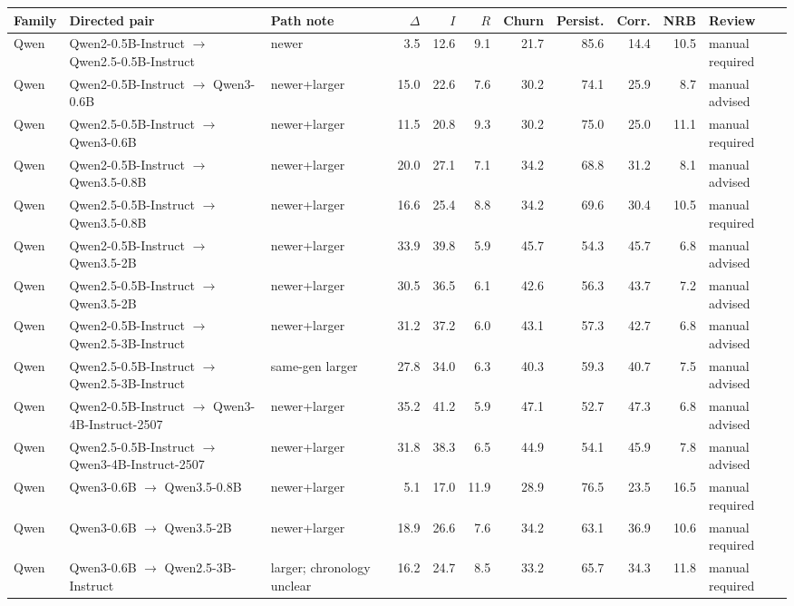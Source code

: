 \begin{tabular}{lllrrrrrrrl}
\toprule
Family & Directed pair & Path note & $\Delta$ & $I$ & $R$ & Churn & Persist. & Corr. & NRB & Review \\
\midrule
Qwen & Qwen2-0.5B-Instruct $\rightarrow$ Qwen2.5-0.5B-Instruct & newer & 3.5 & 12.6 & 9.1 & 21.7 & 85.6 & 14.4 & 10.5 & manual required \\
Qwen & Qwen2-0.5B-Instruct $\rightarrow$ Qwen3-0.6B & newer+larger & 15.0 & 22.6 & 7.6 & 30.2 & 74.1 & 25.9 & 8.7 & manual advised \\
Qwen & Qwen2.5-0.5B-Instruct $\rightarrow$ Qwen3-0.6B & newer+larger & 11.5 & 20.8 & 9.3 & 30.2 & 75.0 & 25.0 & 11.1 & manual required \\
Qwen & Qwen2-0.5B-Instruct $\rightarrow$ Qwen3.5-0.8B & newer+larger & 20.0 & 27.1 & 7.1 & 34.2 & 68.8 & 31.2 & 8.1 & manual advised \\
Qwen & Qwen2.5-0.5B-Instruct $\rightarrow$ Qwen3.5-0.8B & newer+larger & 16.6 & 25.4 & 8.8 & 34.2 & 69.6 & 30.4 & 10.5 & manual required \\
Qwen & Qwen2-0.5B-Instruct $\rightarrow$ Qwen3.5-2B & newer+larger & 33.9 & 39.8 & 5.9 & 45.7 & 54.3 & 45.7 & 6.8 & manual advised \\
Qwen & Qwen2.5-0.5B-Instruct $\rightarrow$ Qwen3.5-2B & newer+larger & 30.5 & 36.5 & 6.1 & 42.6 & 56.3 & 43.7 & 7.2 & manual advised \\
Qwen & Qwen2-0.5B-Instruct $\rightarrow$ Qwen2.5-3B-Instruct & newer+larger & 31.2 & 37.2 & 6.0 & 43.1 & 57.3 & 42.7 & 6.8 & manual advised \\
Qwen & Qwen2.5-0.5B-Instruct $\rightarrow$ Qwen2.5-3B-Instruct & same-gen larger & 27.8 & 34.0 & 6.3 & 40.3 & 59.3 & 40.7 & 7.5 & manual advised \\
Qwen & Qwen2-0.5B-Instruct $\rightarrow$ Qwen3-4B-Instruct-2507 & newer+larger & 35.2 & 41.2 & 5.9 & 47.1 & 52.7 & 47.3 & 6.8 & manual advised \\
Qwen & Qwen2.5-0.5B-Instruct $\rightarrow$ Qwen3-4B-Instruct-2507 & newer+larger & 31.8 & 38.3 & 6.5 & 44.9 & 54.1 & 45.9 & 7.8 & manual advised \\
Qwen & Qwen3-0.6B $\rightarrow$ Qwen3.5-0.8B & newer+larger & 5.1 & 17.0 & 11.9 & 28.9 & 76.5 & 23.5 & 16.5 & manual required \\
Qwen & Qwen3-0.6B $\rightarrow$ Qwen3.5-2B & newer+larger & 18.9 & 26.6 & 7.6 & 34.2 & 63.1 & 36.9 & 10.6 & manual required \\
Qwen & Qwen3-0.6B $\rightarrow$ Qwen2.5-3B-Instruct & larger; chronology unclear & 16.2 & 24.7 & 8.5 & 33.2 & 65.7 & 34.3 & 11.8 & manual required \\

\end{tabular}
